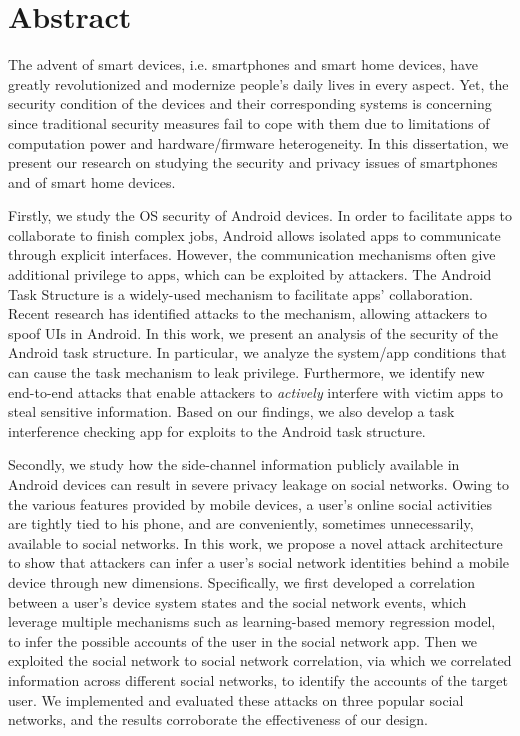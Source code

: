 \documentclass[letterpaper,12pt]{article}
\begin{document}
   \newpage
      \section{Abstract}
   The advent of smart devices, i.e. smartphones and smart home devices, have greatly revolutionized and modernize people's daily lives in every aspect. Yet, the security condition of the devices and their corresponding systems is concerning since traditional security measures fail to cope with them due to limitations of computation power and hardware/firmware heterogeneity. In this dissertation, we present our research on studying the security and privacy issues of smartphones and of smart home devices.
   
   Firstly, we study the OS security of Android devices. In order to facilitate apps to collaborate to finish complex jobs, Android allows isolated apps to communicate through explicit interfaces. However, the communication mechanisms often give additional privilege to apps, which can be exploited by attackers. The Android Task Structure is a widely-used mechanism to facilitate apps' collaboration. Recent research has identified attacks to the mechanism, allowing attackers to spoof UIs in Android. In this work, we present an analysis of the security of the Android task structure. In particular, we analyze the system/app conditions that can cause the task mechanism to leak privilege. Furthermore, we identify new end-to-end attacks that enable attackers to {\em actively} interfere with victim apps to steal sensitive information. Based on our findings, we also develop a task interference checking app for exploits to the Android task structure.
   
    Secondly, we study how the side-channel information publicly available in Android devices can result in severe privacy leakage on social networks. Owing to the various features provided by mobile devices, a user's online social activities are tightly tied to his phone, and are conveniently, sometimes unnecessarily, available to social networks. In this work, we propose a novel attack architecture to show that attackers can infer a user's social network identities behind a mobile device through new dimensions. Specifically, we first developed a correlation between a user's device system states and the social network events, which leverage multiple mechanisms such as learning-based memory regression model, to infer the possible accounts of the user in the social network app. Then we exploited the social network to social network correlation, via which we correlated information across different social networks, to identify the accounts of the target user. We implemented and evaluated these attacks on three popular social networks, and the results corroborate the effectiveness of our design.
    
\end{document}

